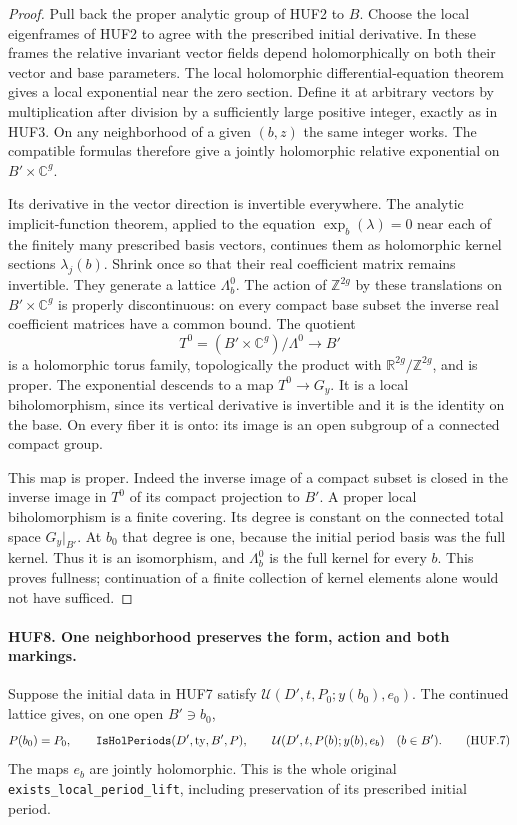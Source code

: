 \documentclass[11pt,a4paper]{article}
\numberwithin{equation}{section}
\theoremstyle{remark}\newtheorem{remark}[theorem]{Remark}
\begin{document}
\begin{proof}
Pull back the proper analytic group of HUF2 to \(B\).
Choose the local eigenframes of HUF2 to agree with the
prescribed initial derivative.  In these frames the
relative invariant vector fields depend holomorphically
on both their vector and base parameters.  The local
holomorphic differential-equation theorem gives a local
exponential near the zero section.  Define it at arbitrary
vectors by multiplication after division by a sufficiently
large positive integer, exactly as in HUF3.  On any
neighborhood of a given \((b,z)\) the same integer works.
The compatible formulas therefore give a jointly
holomorphic relative exponential on \(B'\times\mathbb C^g\).

Its derivative in the vector direction is invertible
everywhere.  The analytic implicit-function theorem,
applied to the equation \(\exp_b(\lambda)=0\) near each
of the finitely many prescribed basis vectors, continues
them as holomorphic kernel sections \(\lambda_j(b)\).
Shrink once so that their real coefficient matrix remains
invertible.  They generate a lattice \(\Lambda_b^0\).
The action of \(\mathbb Z^{2g}\) by these translations
on \(B'\times\mathbb C^g\) is properly discontinuous:
on every compact base subset the inverse real coefficient
matrices have a common bound.  The quotient
\[
       T^0=(B'\times\mathbb C^g)/\Lambda^0
                         \longrightarrow B'
\]
is a holomorphic torus family, topologically the product
with \(\mathbb R^{2g}/\mathbb Z^{2g}\), and is proper.
The exponential descends to a map \(T^0\to G_y\).
It is a local biholomorphism, since its vertical derivative
is invertible and it is the identity on the base.
On every fiber it is onto: its image is an open subgroup
of a connected compact group.

This map is proper.  Indeed the inverse image of a
compact subset is closed in the inverse image in \(T^0\)
of its compact projection to \(B'\).  A proper local
biholomorphism is a finite covering.  Its degree is
constant on the connected total space \(G_y|_{B'}\).
At \(b_0\) that degree is one, because the initial
period basis was the full kernel.  Thus it is an
isomorphism, and \(\Lambda_b^0\) is the full kernel
for every \(b\).  This proves fullness; continuation
of a finite collection of kernel elements alone would
not have sufficed.
\end{proof}

\paragraph{HUF8. One neighborhood preserves the form, action and both markings.}
\label{claim:HUF8}
Suppose the initial data in HUF7 satisfy
\(\mathcal U(D',t,P_0;y(b_0),e_0)\).
The continued lattice gives, on one open \(B'\ni b_0\),
\[
 P(b_0)=P_0,\qquad \texttt{Is\allowbreak Hol\allowbreak Periods}(D',\mathrm{ty},B',P),
 \qquad
 \mathcal U(D',t,P(b);y(b),e_b)\quad(b\in B').
 \tag{HUF.7}
\]
The maps \(e_b\) are jointly holomorphic.  This is the
whole original \texttt{exists\_\allowbreak local\_\allowbreak period\_\allowbreak lift}, including
preservation of its prescribed initial period.
\end{document}
